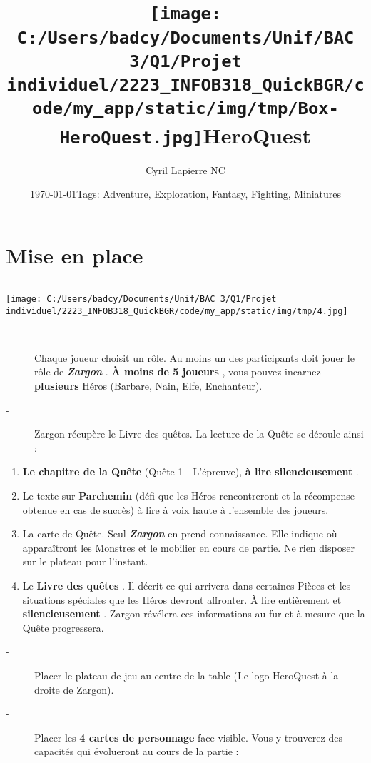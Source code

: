\documentclass{scrartcl}%
\title{\texttt{[image: C:/Users/badcy/Documents/Unif/BAC 3/Q1/Projet individuel/2223\_INFOB318\_QuickBGR/code/my\_app/static/img/tmp/Box-HeroQuest.jpg]}\break HeroQuest }%
\author{Cyril Lapierre NC}%
\date{\today \break Tags: Adventure, Exploration, Fantasy, Fighting, Miniatures}%
\begin{document}
%
\normalsize%
\maketitle\thispagestyle{header}%
\pagestyle{header}%
\section{ Mise en place
}%
\label{sec:Miseenplace}%
\rule{18cm}{0.07cm}\break%
%
\begin{center}\texttt{[image: C:/Users/badcy/Documents/Unif/BAC 3/Q1/Projet individuel/2223\_INFOB318\_QuickBGR/code/my\_app/static/img/tmp/4.jpg]}\end{center}%

%
\begin{description}%
\item[{-} ]%
%
 Chaque joueur choisit un rôle. Au moins un des participants doit jouer le rôle de%
\textbf{\textit{ Zargon}}%
.%
\textbf{ À moins de 5 joueurs}%
, vous pouvez incarnez %
\textbf{plusieurs}%
\textit{ }%
 Héros (Barbare, Nain, Elfe, Enchanteur).
%
\item[{-} ]%
%
 Zargon récupère le Livre des quêtes. La lecture de la Quête se déroule ainsi :
%
\end{description}%
\begin{enumerate}%
\item%
%
\textbf{Le chapitre de la Quête}%
\textit{ }%
 (Quête 1 {-} L'épreuve), %
\textbf{à lire silencieusement}%
.
%
\item%
%
 Le texte sur%
\textbf{ Parchemin}%
\textit{ }%
 (défi que les Héros rencontreront et la récompense obtenue en cas de succès) à lire à voix haute à l'ensemble des joueurs.
%
\item%
%
 La carte de Quête. Seul %
\textbf{\textit{Zargon}}%
\textit{ }%
 en prend connaissance. Elle indique où apparaîtront les Monstres et le mobilier en cours de partie. Ne rien disposer sur le plateau pour l'instant.
%
\item%
%
 Le %
\textbf{Livre des quêtes}%
. Il décrit ce qui arrivera dans certaines Pièces et les situations spéciales que les Héros devront affronter. À lire entièrement et %
\textbf{silencieusement}%
. Zargon révélera ces informations au fur et à mesure que la Quête progressera.
%
\end{enumerate}%
\begin{description}%
\item[{-} ]%
%
 Placer le plateau de jeu au centre de la table (Le logo HeroQuest à la droite de Zargon).
%
\item[{-} ]%
%
 Placer les %
\textbf{4 cartes de personnage}%
\textit{ }%
 face visible. Vous y trouverez des capacités qui évolueront au cours de la partie :
%
\end{description}%
\end{document}
